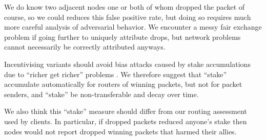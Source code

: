 ﻿\documentclass{sig-alternate-hotpets}
\begin{document}
We do know two adjacent nodes one or both of whom dropped the packet
of course, so we could reduces this false positive rate, but doing so
requires much more careful analysis of adversarial behavior.
We encounter a messy fair exchange problem if going further to uniquely
attribute drops, but network problems cannot necessarily be correctly
attributed anyways.


Incentivising variants should avoid bias attacks caused by
stake accumulations due to ``richer get richer'' problems \cite{CompoundingPoS}.
We therefore suggest that ``stake'' accumulate automatically for
routers of winning packets, but not for packet senders, and %
``stake'' be non-transferable and decay over time. 

We also think this ``stake'' measure should differ from our routing
assessment used by clients.  In particular, if dropped packets reduced
anyone's stake then nodes would not report dropped winning packets
that harmed their allies. 





\end{document}
